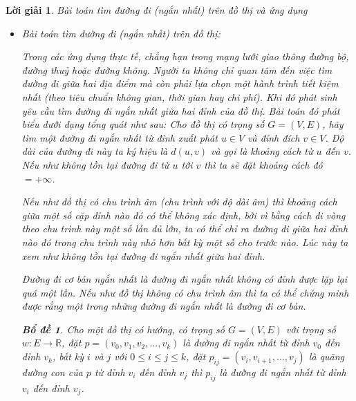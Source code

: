 \documentclass[14pt, a4paper]{article}
\newtheorem{bd}{Bổ đề}
\theoremstyle{sltheorem}
\theoremstyle{soltheorem}
\newtheorem*{loigiai}{Lời giải}
\begin{document}
    \begin{loigiai}

        Bài toán tìm đường đi (ngắn nhất) trên đồ thị và ứng dụng

        \begin{itemize}
            \item Bài toán tìm đường đi (ngắn nhất) trên đồ thị:
            
            Trong các ứng dụng thực tế, chẳng hạn trong mạng lưới giao thông đường bộ, đường thuỷ hoặc
            đường không. Người ta không chỉ quan tâm đến việc tìm đường đi giữa hai địa điểm mà còn phải
            lựa chọn một hành trình tiết kiệm nhất (theo tiêu chuẩn không gian, thời gian hay chi phí). Khi đó
            phát sinh yêu cầu tìm đường đi ngắn nhất giữa hai đỉnh của đồ thị. Bài toán đó phát biểu dưới dạng
            tổng quát như sau: Cho đồ thị có trọng số $G=(V, E)$, hãy tìm một đường đi ngắn nhất từ đỉnh xuất
            phát $u \in V$ và đỉnh đích $v \in V$. Độ dài của đường đi này ta ký hiệu là $d(u, v)$ và gọi là khoảng
            cách từ $u$ đến $v$. Nếu như không tồn tại đường đi từ $u$ tới $v$ thì ta sẽ đặt khoảng cách đó $=+ \infty$.
            
            Nếu như đồ thị có chu trình âm (chu trình với độ dài âm) thì khoảng cách giữa một số cặp đỉnh nào
            đó có thể không xác định, bởi vì bằng cách đi vòng theo chu trình này một số lần đủ lớn, ta có thể
            chỉ ra đường đi giữa hai đỉnh nào đó trong chu trình này nhỏ hơn bất kỳ một số cho trước nào.
            Lúc này ta xem như không tồn tại đường đi ngắn nhất giữa hai đỉnh.

            Đường đi cơ bản ngắn nhất là đường đi ngắn nhất không có đỉnh được lặp lại quá một lần.
            Nếu như đồ thị không có chu trình âm thì ta có thể chứng minh được rằng một trong những đường
            đi ngắn nhất là đường đi cơ bản.

            \begin{bd}
                Cho một đồ thị có hướng, có trọng số $G=(V, E)$ với trọng số $w: E \rightarrow \mathbb{R}$,
                đặt $p=(v_0, v_1, v_2, \dots, v_k)$ là đường đi ngắn nhất từ đỉnh $v_0$ đến đỉnh $v_k$, bất kỳ $i$ và $j$ với $0 \leq i \leq j \leq k$,
                đặt $p_{ij}=(v_i, v_{i+1}, \dots, v_j)$ là quãng đường con của $p$ từ đỉnh $v_i$ đến đỉnh $v_j$ thì $p_{ij}$ là đường đi ngắn nhất từ đỉnh $v_i$ đến đỉnh $v_j$.
            \end{bd}


\end{itemize}
\end{loigiai}
\end{document}
